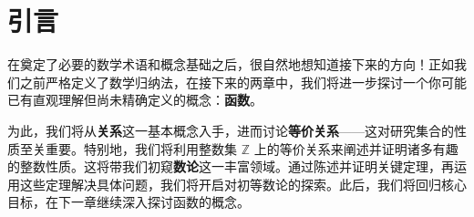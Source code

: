 \section{引言}

在奠定了必要的数学术语和概念基础之后，很自然地想知道接下来的方向！正如我们之前严格定义了数学归纳法，在接下来的两章中，我们将进一步探讨一个你可能已有直观理解但尚未精确定义的概念：\textbf{函数}。

为此，我们将从\textbf{关系}这一基本概念入手，进而讨论\textbf{等价关系}——这对研究集合的性质至关重要。特别地，我们将利用整数集 $\mathbb{Z}$ 上的等价关系来阐述并证明诸多有趣的整数性质。这将带我们初窥\textbf{数论}这一丰富领域。通过陈述并证明关键定理，再运用这些定理解决具体问题，我们将开启对初等数论的探索。此后，我们将回归核心目标，在下一章继续深入探讨函数的概念。







